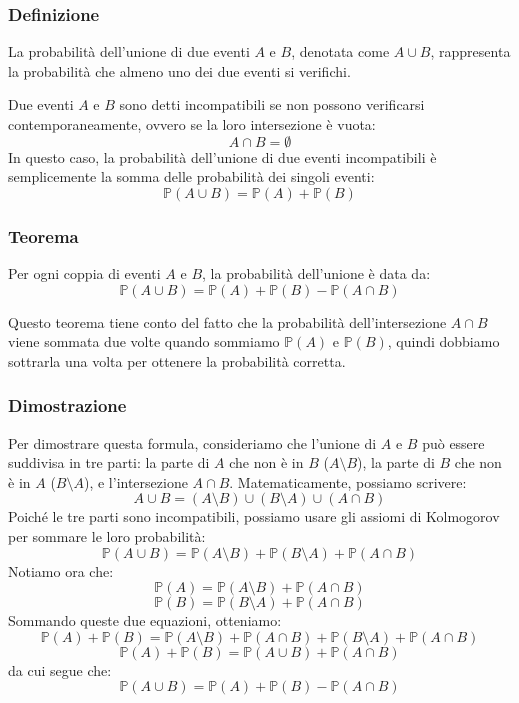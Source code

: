 \documentclass{article}
\begin{document}
\subsubsection{Definizione}
La probabilità dell'unione di due eventi \(A\) e \(B\), denotata come \(A \cup B\),
rappresenta la probabilità che almeno uno dei due eventi si verifichi.

Due eventi \(A\) e \(B\) sono detti incompatibili se non possono verificarsi
contemporaneamente, ovvero se la loro intersezione è vuota:
\[
A \cap B = \emptyset
\]
In questo caso, la probabilità dell'unione di due eventi incompatibili è semplicemente la
somma delle probabilità dei singoli eventi:
\[
\mathbb{P}(A \cup B) = \mathbb{P}(A) + \mathbb{P}(B)
\]

\subsubsection{Teorema}
Per ogni coppia di eventi \(A\) e \(B\), la probabilità dell'unione è data da:
\[
\mathbb{P}(A \cup B) = \mathbb{P}(A) + \mathbb{P}(B) - \mathbb{P}(A \cap B)
\]

Questo teorema tiene conto del fatto che la probabilità dell'intersezione \(A \cap B\) viene
sommata due volte quando sommiamo \(\mathbb{P}(A)\) e \(\mathbb{P}(B)\), quindi dobbiamo sottrarla una volta per
ottenere la probabilità corretta.

\subsubsection{Dimostrazione}
Per dimostrare questa formula, consideriamo che l'unione di \(A\) e \(B\) può essere suddivisa
in tre parti: la parte di \(A\) che non è in \(B\) (\(A \setminus B\)), la parte di \(B\) che
non è in \(A\) (\(B \setminus A\)), e l'intersezione \(A \cap B\). Matematicamente, possiamo
scrivere:
\[
    A \cup B = (A \setminus B) \cup (B \setminus A) \cup (A \cap B)
\]
Poiché le tre parti sono incompatibili, possiamo usare gli assiomi di Kolmogorov per sommare
le loro probabilità:
\[
    \mathbb{P}(A \cup B) = \mathbb{P}(A \setminus B) + \mathbb{P}(B \setminus A) +
    \mathbb{P}(A \cap B)
\]
Notiamo ora che:
\[
    \mathbb{P}(A) = \mathbb{P}(A \setminus B) + \mathbb{P}(A \cap B)
\]
\[
    \mathbb{P}(B) = \mathbb{P}(B \setminus A) + \mathbb{P}(A \cap B)
\]
Sommando queste due equazioni, otteniamo:
\[
    \mathbb{P}(A) + \mathbb{P}(B) = \mathbb{P}(A \setminus B) + \mathbb{P}(A \cap B) +
    \mathbb{P}(B \setminus A) + \mathbb{P}(A \cap B)
\]
\[
    \mathbb{P}(A) + \mathbb{P}(B) = \mathbb{P}(A \cup B) + \mathbb{P}(A \cap B)
\]
da cui segue che:
\[
    \mathbb{P}(A \cup B) = \mathbb{P}(A) + \mathbb{P}(B) - \mathbb{P}(A \cap B)
\]
\end{document}
